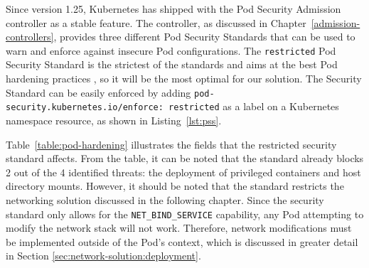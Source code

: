 \documentclass[english, 12pt, a4paper, sci, utf8, a-2b, online]{aaltothesis}
\begin{document}
Since version 1.25, Kubernetes has shipped with the Pod Security Admission controller as a stable feature.
The controller, as discussed in Chapter~\ref{admission-controllers}, provides three different Pod Security Standards that can be used to warn and enforce against insecure Pod configurations.
The \lstinline{restricted} Pod Security Standard is the strictest of the standards and aims at the best Pod hardening practices \cite{k8s-docs-pss}, so it will be the most optimal for our solution.
The Security Standard can be easily enforced by adding \lstinline{pod-security.kubernetes.io/enforce: restricted} as a label on a Kubernetes namespace resource, as shown in Listing~\ref{lst:pss}.



Table~\ref{table:pod-hardening} illustrates the fields that the restricted security standard affects.
From the table, it can be noted that the standard already blocks 2 out of the 4 identified threats: the deployment of privileged containers and host directory mounts.
However, it should be noted that the standard restricts the networking solution discussed in the following chapter.
Since the security standard only allows for the \lstinline{NET_BIND_SERVICE} capability, any Pod attempting to modify the network stack will not work.
Therefore, network modifications must be implemented outside of the Pod's context, which is discussed in greater detail in Section \ref{sec:network-solution:deployment}.
\end{document}
